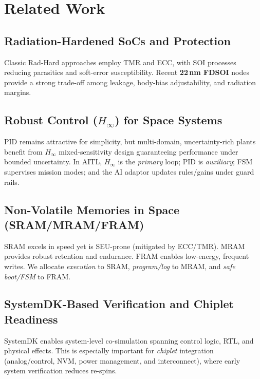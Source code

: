 \documentclass[conference]{IEEEtran}
\begin{document}
\section{Related Work}
\subsection{Radiation-Hardened SoCs and Protection}
Classic Rad-Hard approaches employ TMR and ECC, with SOI processes reducing
parasitics and soft-error susceptibility. Recent \textbf{22\,nm FDSOI} nodes provide a strong
trade-off among leakage, body-bias adjustability, and radiation margins.

\subsection{Robust Control ($H_\infty$) for Space Systems}
PID remains attractive for simplicity, but multi-domain, uncertainty-rich plants
benefit from $H_\infty$ mixed-sensitivity design guaranteeing performance under bounded
uncertainty. In AITL, $H_\infty$ is the \emph{primary} loop; PID is \emph{auxiliary};
FSM supervises mission modes; and the AI adaptor updates rules/gains under guard rails.

\subsection{Non-Volatile Memories in Space (SRAM/MRAM/FRAM)}
SRAM excels in speed yet is SEU-prone (mitigated by ECC/TMR). MRAM provides robust
retention and endurance. FRAM enables low-energy, frequent writes. We allocate
\emph{execution} to SRAM, \emph{program/log} to MRAM, and \emph{safe boot/FSM} to FRAM.

\subsection{SystemDK-Based Verification and Chiplet Readiness}
SystemDK enables system-level co-simulation spanning control logic, RTL, and physical
effects. This is especially important for \emph{chiplet} integration (analog/control, NVM,
power management, and interconnect), where early system verification reduces re-spins.
\end{document}
